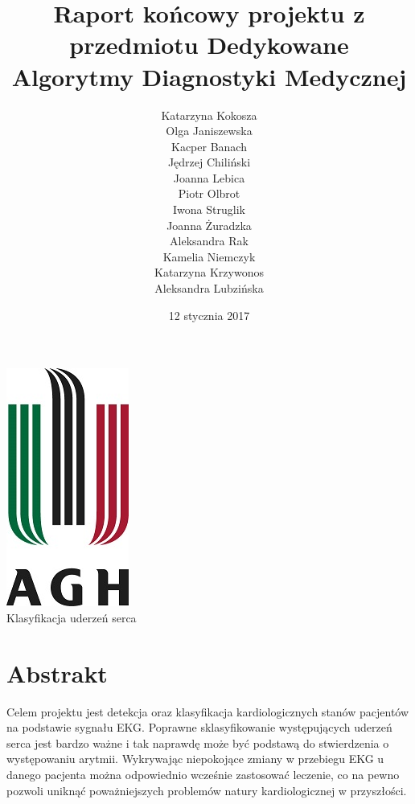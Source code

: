 \documentclass[[10pt,a4paper]{article}
\begin{document}
\title{Raport końcowy projektu z przedmiotu Dedykowane Algorytmy Diagnostyki Medycznej}
\author{Katarzyna Kokosza\\ Olga Janiszewska\\ Kacper Banach \\ Jędrzej Chiliński 
\\Joanna Lebica \\Piotr Olbrot \\ Iwona Struglik \\ Joanna Żuradzka \\ Aleksandra Rak \\ Kamelia Niemczyk \\ Katarzyna Krzywonos \\ Aleksandra Lubzińska }
\date{12 stycznia 2017}
\maketitle


\begin{center}
\includegraphics{logo_agh}\\
\vspace{20mm}
{\LARGE Klasyfikacja uderzeń serca}\\

\end{center}

\newpage
\tableofcontents
\vspace{10mm}
\newpage
\section{Abstrakt}
Celem projektu jest detekcja oraz klasyfikacja kardiologicznych stanów pacjentów na podstawie sygnału EKG. Poprawne sklasyfikowanie występujących uderzeń serca jest bardzo ważne 
i tak naprawdę może być podstawą do stwierdzenia o występowaniu arytmii. Wykrywając niepokojące zmiany w przebiegu EKG u danego pacjenta można odpowiednio wcześnie zastosować leczenie, co na pewno pozwoli uniknąć poważniejszych problemów natury kardiologicznej w przyszłości.  
\end{document}
